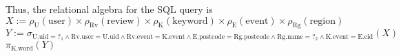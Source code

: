 \documentclass{article}
\newcommand{\GETS}{:=}
\newcommand{\rename}{\rho}
\newcommand{\select}{\sigma}
\newcommand{\rel}[1]{\text{#1}}
\newcommand{\attr}[1]{\text{#1}}
\newcommand{\ra}[2]{\rel{#1}.\attr{#2}}
\newcommand{\project}{\pi}
\newcommand{\product}{\times}
\begin{document}
\begin{enumerate}
    Thus, the relational algebra for the SQL query is \\
    $X \GETS \rename_{\rel{U}}(\rel{user}) \product
              \rename_{\rel{Rv}}(\rel{review}) \product
              \rename_{\rel{K}}(\rel{keyword}) \product
              \rename_{\rel{E}}(\rel{event}) \product
              \rename_{\rel{Rg}}(\rel{region})$ \\
    $Y \GETS \select_{\ra{U}{uid} = ?_1 \land
                        \ra{Rv}{user} = \ra{U}{uid} \land
                        \ra{Rv}{event} = \ra{K}{event} \land
                        \ra{E}{postcode} = \ra{Rg}{postcode} \land
                        \ra{Rg}{name} = ?_2 \land
                        \ra{K}{event} = \ra{E}{eid}}(X)$ \\
    $\project_{\ra{K}{word}}(Y)$


\end{enumerate}
\end{document}
